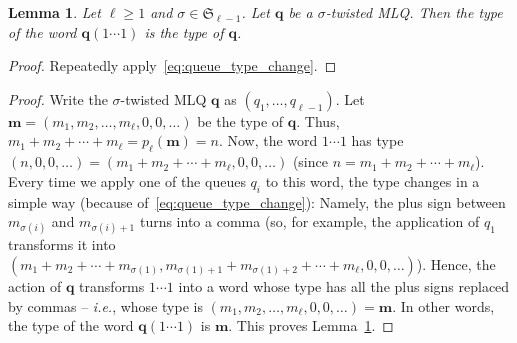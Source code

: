 \documentclass[reqno]{amsart}
\newcommand{\0}{\phantom{c}}
\newcommand{\SymGp}[1]{\mathfrak{S}_{#1}} %
\newcommand{\mm}{\mathbf{m}}
\newcommand{\qq}{\mathbf{q}}
\newenvironment{verlong}{}{}
\newenvironment{vershort}{}{}
\newcommand{\tup}[1]{\left( #1 \right)}
\theoremstyle{plain}
\newtheorem{lemma}[thm]{Lemma}
\theoremstyle{definition}
\numberwithin{equation}{section}
\begin{document}
\begin{lemma}
\label{rmk:mlq-type}
Let $\ell \geq 1$ and $\sigma \in \SymGp{\ell-1}$.
Let $\qq$ be a $\sigma$-twisted MLQ.
Then the type of the word $\qq(1 \dotsm 1)$ is the type of $\qq$.
\end{lemma}

\begin{vershort}
\begin{proof}
Repeatedly apply~\eqref{eq:queue_type_change}.
\end{proof}
\end{vershort}

\begin{verlong}
\begin{proof}
Write the $\sigma$-twisted MLQ $\qq$ as $\tup{q_1, \ldots, q_{\ell-1}}$.
Let $\mm = \tup{m_1, m_2, \ldots, m_\ell, 0, 0, \ldots}$ be the type of $\qq$.
Thus, $m_1 + m_2 + \cdots + m_\ell = p_{\ell}(\mm) = n$.
Now, the word $1 \dotsm 1$ has type $\tup{n, 0, 0, \ldots} = \tup{m_1 + m_2 + \cdots + m_\ell, 0, 0, \ldots}$
(since $n = m_1 + m_2 + \cdots + m_\ell$).
Every time we apply one of the queues $q_i$ to this word, the type changes in a simple way (because of~\eqref{eq:queue_type_change}): Namely, the plus sign between $m_{\sigma(i)}$ and $m_{\sigma(i)+1}$ turns into a comma (so, for example, the application of $q_1$ transforms it into $\tup{m_1 + m_2 + \cdots + m_{\sigma(1)}, m_{\sigma(1)+1} + m_{\sigma(1)+2} + \cdots + m_\ell, 0, 0, \ldots}$).
Hence, the action of $\qq$ transforms $1 \dotsm 1$ into a word whose type has all the plus signs replaced by commas -- \textit{i.e.}, whose type is $\tup{m_1, m_2, \ldots, m_\ell, 0, 0, \ldots} = \mm$.
In other words, the type of the word $\qq(1 \dotsm 1)$ is $\mm$.
This proves Lemma~\ref{rmk:mlq-type}.


\end{proof}
\end{verlong}
\end{document}

